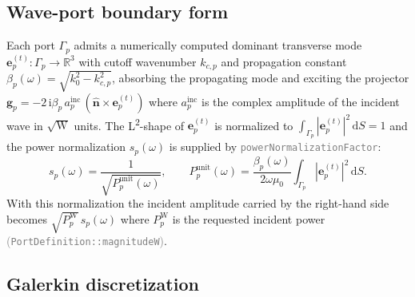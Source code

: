 \documentclass[11pt,a4paper]{article}
\newcommand{\R}{\mathbb{R}}
\newcommand{\im}{\mathrm{i}}
\begin{document}
\subsection{Wave-port boundary form}

Each port $\Gamma_p$ admits a numerically computed dominant transverse
mode $\bm e_p^{(t)}: \Gamma_p \to \R^3$ with cutoff wavenumber
$k_{c,p}$ and propagation constant
\(
  \beta_p(\omega) = \sqrt{k_0^2 - k_{c,p}^2}
\),
absorbing the propagating mode and exciting the projector
\(
  \bm g_p = -2\,\im\beta_p\,a_p^{\mathrm{inc}}\,(\hat{\bm n}\times\bm e_p^{(t)})
\)
where $a_p^{\mathrm{inc}}$ is the complex amplitude of the incident wave
in $\sqrt{\mathrm{W}}$ units. The L\textsuperscript{2}-shape of
$\bm e_p^{(t)}$ is normalized to
$\int_{\Gamma_p} |\bm e_p^{(t)}|^2\,\mathrm dS = 1$
and the power normalization $s_p(\omega)$ is supplied by
\textcolor{gray}{\texttt{powerNormalizationFactor}}:
\begin{equation}
  s_p(\omega) = \frac{1}{\sqrt{P_p^{\mathrm{unit}}(\omega)}}, \qquad
  P_p^{\mathrm{unit}}(\omega) = \frac{\beta_p(\omega)}{2\omega\mu_0}
  \int_{\Gamma_p}|\bm e_p^{(t)}|^2\,\mathrm dS.
  \label{eq:powernorm}
\end{equation}
With this normalization the incident amplitude carried by the right-hand
side becomes $\sqrt{P_p^{\mathrm W}}\,s_p(\omega)$ where
$P_p^{\mathrm W}$ is the requested incident power
\textcolor{gray}{(\texttt{PortDefinition::magnitudeW})}.

\subsection{Galerkin discretization}
\end{document}
